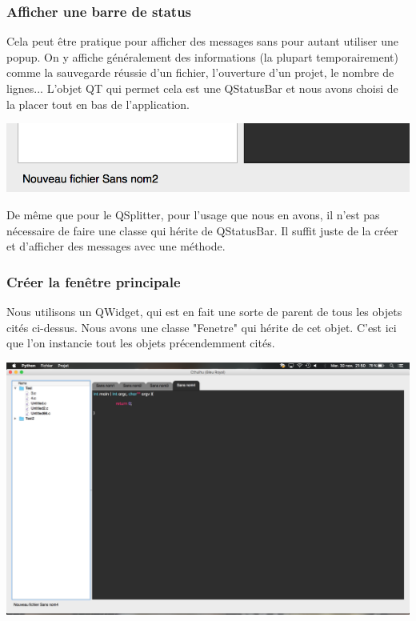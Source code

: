 \documentclass[a4paper,12pt]{article}
\begin{document}
			\subsubsection*{Afficher une barre de status}
			 Cela peut être pratique pour afficher des messages sans pour autant utiliser une popup. On y affiche généralement des informations (la plupart temporairement) comme la sauvegarde réussie d'un fichier, l'ouverture d'un projet, le nombre de lignes... L'objet QT qui permet cela est une QStatusBar et nous avons choisi de la placer tout en bas de l'application.\\
			\begin{center}
				\includegraphics[scale=0.6]{images/QStatusBar}
				\vspace{0.6cm}
			\end{center}
			De même que pour le QSplitter, pour l'usage que nous en avons, il n'est pas nécessaire de faire une classe qui hérite de QStatusBar. Il suffit juste de la créer et d'afficher des messages avec une méthode.\\
			
			
			\subsubsection*{Créer la fenêtre principale}
			Nous utilisons un QWidget, qui est en fait une sorte de parent de tous les objets cités ci-dessus. Nous avons une classe "Fenetre" qui hérite de cet objet. C'est ici que l'on instancie tout les objets précendemment cités.\\
			\begin{center}
				\includegraphics[scale=0.2]{images/QWidget}
				\vspace{0.6cm}
			\end{center}
			
\end{document}
